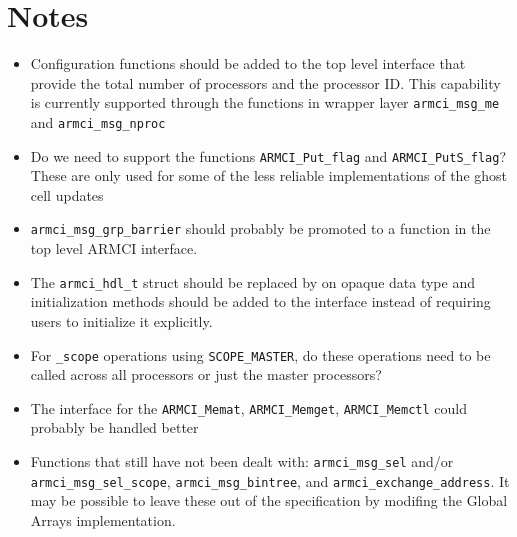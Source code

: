 \documentclass[12pt]{article}
\begin{document}
\section{Notes}
\begin{itemize}
\item Configuration functions should be added to the top level interface that
provide the total number of processors and the processor ID. This capability is
currently supported through the functions in wrapper layer
\texttt{armci\_msg\_me} and \texttt{armci\_msg\_nproc}
\item Do we need to support the functions \texttt{ARMCI\_Put\_flag} and
\texttt{ARMCI\_PutS\_flag}? These are only used for some of the less reliable
implementations of the ghost cell updates
\item \texttt{armci\_msg\_grp\_barrier} should probably be promoted to a
function in the top level ARMCI interface.
\item The \texttt{armci\_hdl\_t} struct should be replaced by on opaque data
type and initialization methods should be added to the interface instead of
requiring users to initialize it explicitly.
\item For \texttt{\_scope} operations using \texttt{SCOPE\_MASTER}, do these
operations need to be called across all processors or just the master
processors?
\item The interface for the \texttt{ARMCI\_Memat}, \texttt{ARMCI\_Memget},
\texttt{ARMCI\_Memctl} could probably be handled better
\item Functions that still have not been dealt with: \texttt{armci\_msg\_sel}
and/or \texttt{armci\_msg\_sel\_scope}, \texttt{armci\_msg\_bintree}, and
\texttt{armci\_exchange\_address}. It may be possible to leave these out of the
specification by modifing the Global Arrays implementation.
\end{itemize}
\end{document}
